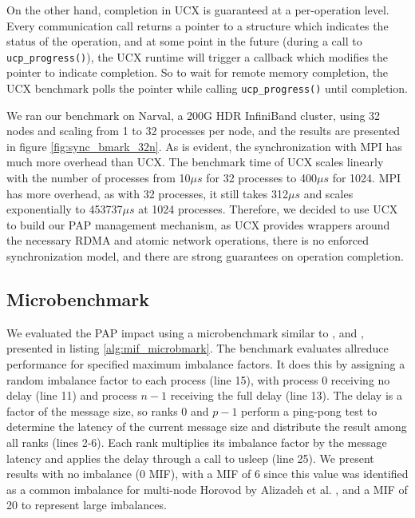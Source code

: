 On the other hand, completion in UCX is guaranteed at a per-operation level. 
Every communication call returns a pointer to a structure which indicates the status of the operation, and at some point in the future (during a call to \texttt{ucp\_progress()}), the UCX runtime will trigger a callback which modifies the pointer to indicate completion.
So to wait for remote memory completion, the UCX benchmark polls the pointer while calling \texttt{ucp\_progress()} until completion.

We ran our benchmark on Narval, a 200G HDR InfiniBand cluster, using 32 nodes and scaling from 1 to 32 processes per node, and the results are presented in figure \ref{fig:sync_bmark_32n}.
As is evident, the synchronization with MPI has much more overhead than UCX.
The benchmark time of UCX scales linearly with the number of processes from 10$\mu s$ for 32 processes to 400$\mu s$ for 1024.
MPI has more overhead, as with 32 processes, it still takes 312$\mu s$ and scales exponentially to 453737$\mu s$ at 1024 processes.
Therefore, we decided to use UCX to build our PAP management mechanism, as UCX provides wrappers around the necessary RDMA and atomic network operations, there is no enforced synchronization model, and there are strong guarantees on operation completion. 




\subsection{Microbenchmark}
We evaluated the PAP impact using a microbenchmark similar to \cite{Faraj2008StudyProcArrivalMPIColl}, and \cite{Li2020DLPartialColl}, presented in listing \ref{alg:mif_microbmark}.
The benchmark evaluates allreduce performance for specified maximum imbalance factors. 
It does this by assigning a random imbalance factor to each process (line 15), with process 0 receiving no delay (line 11) and process $n-1$ receiving the full delay (line 13).
The delay is a factor of the message size, so ranks 0 and $p-1$ perform a ping-pong test to determine the latency of the current message size and distribute the result among all ranks (lines 2-6).
Each rank multiplies its imbalance factor by the message latency and applies the delay through a call to usleep (line 25).
We present results with no imbalance (0 MIF), with a MIF of 6 since this value was identified as a common imbalance for multi-node Horovod by Alizadeh et al. \cite{Alizadeh2022PAPCollDL}, and a MIF of 20 to represent large imbalances.


